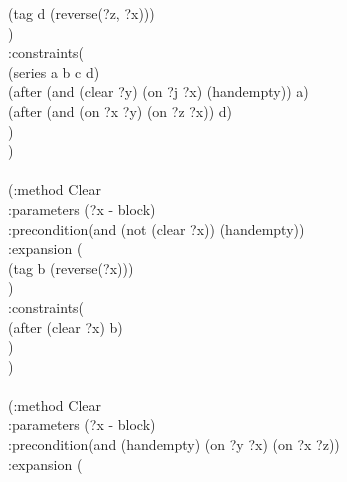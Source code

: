 \begin{appendix}
\hspace*{2.5cm}        (tag d (reverse(?z, ?x)))\\
\hspace*{2cm}  )\\
\hspace*{2cm}  :constraints(\\
\hspace*{2.5cm}        (series a b c d)\\
\hspace*{2.5cm}        (after (and (clear ?y) (on ?j ?x) (handempty)) a)\\
\hspace*{2.5cm}        (after (and (on ?x ?y) (on ?z ?x)) d)\\
\hspace*{2cm}  )\\
\hspace*{1.5cm})
\\
\\ \hspace*{1.5cm}(:method Clear\\
\hspace*{2cm}  :parameters  (?x - block)\\
\hspace*{2cm}  :precondition(and (not (clear ?x)) (handempty))\\
\hspace*{2cm}  :expansion  (\\
\hspace*{2.5cm}        (tag b (reverse(?x)))\\
\hspace*{2cm}  )\\
\hspace*{2cm}  :constraints(\\
\hspace*{2.5cm}        (after (clear ?x) b)\\
\hspace*{2cm}  )\\
\hspace*{1.5cm})
\\
\\ \hspace*{1.5cm}(:method Clear\\
\hspace*{2cm}  :parameters  (?x - block)\\
\hspace*{2cm}  :precondition(and (handempty) (on ?y ?x) (on ?x ?z))\\
\hspace*{2cm}  :expansion  (\\

\end{appendix}
